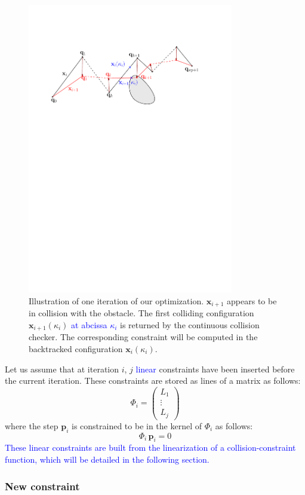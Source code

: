 \documentclass{tADR2e}
\newcommand\p{\mathbf{p}}
\newcommand\xx{\mathbf{x}} %
\newcommand\tcolli{\kappa_i}
\newcommand\Jf{\Phi}
\begin{document}
\begin{figure}
	\centering
	\includegraphics[width=9cm]{optim_grad.pdf}
	\caption{Illustration of one iteration of our optimization.
	$\xx_{i+1}$ appears 
	to be in collision with the obstacle. The first colliding configuration 
	$\xx_{i+1}(\tcolli)$ \textcolor{blue}{at abcissa $\tcolli$} is returned by 
	the continuous collision checker. The 
	corresponding constraint will be computed in the backtracked configuration 
	$\xx_{i}(\tcolli)$.}
	\label{optim_grad}
\end{figure}

Let us assume that at iteration $i$, $j$ \textcolor{blue}{linear} constraints have been inserted before the current iteration. 
These constraints are stored as lines of a matrix as follows:
$$
\Jf_{i} = \left(\begin{array}{c}L_1 \\ \vdots \\ L_j\end{array}\right)
$$
where the step $\p_i$ is constrained to be in the kernel of $\Jf_{i}$ as follows:
$$
\Jf_{i} \, \p_i = 0
$$
\textcolor{blue}{These linear constraints are built from the linearization of a collision-constraint function, which will be detailed in the following section.}

\subsubsection{New constraint}\label{subsubsec:new-constraint}
\end{document}
